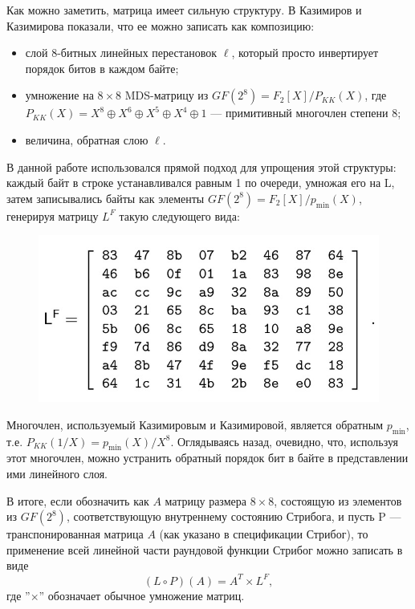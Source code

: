 Как можно заметить, матрица имеет сильную структуру. В \cite{KK13} Казимиров и Казимирова показали, что ее можно записать как композицию:
\begin{itemize}
    \item слой 8-битных линейных перестановок \(\ell\), который просто инвертирует порядок битов в каждом байте;
    \item умножение на $8 \times 8$ MDS-матрицу из $GF(2^8) = F_2[X]/P_{KK}(X)$, где \(P_{KK}(X) = X^8 \oplus X^6 \oplus X^5 \oplus X^4 \oplus 1\) — примитивный многочлен степени 8;
    \item величина, обратная слою \(\ell\).
\end{itemize}

В данной работе использовался прямой подход для упрощения этой структуры: каждый байт в строке устанавливался равным 1 по очереди, умножая его на L, затем записывались байты как элементы $GF(2^8) = F_2[X]/p_{\text{min}}(X)$, генерируя матрицу $L^F$ такую следующего вида:
\begin{figure}
  \centering
  \includegraphics[scale=0.9]{contents/pics/LF_matrix.png}
\end{figure}

Многочлен, используемый Казимировым и Казимировой, является обратным \(p_{\text{min}}\), т.е. \(P_{KK}(1/X) = p_{\text{min}}(X)/X^8\). Оглядываясь назад, очевидно, что, используя этот многочлен, можно устранить обратный порядок бит в байте в представлении ими линейного слоя.

В итоге, если обозначить как $A$ матрицу размера $8 \times 8$, состоящую из элементов из $GF(2^8)$, соответствующую внутреннему состоянию Стрибога, и пусть P — транспонированная матрица $A$ (как указано в спецификации Стрибог), то применение всей линейной части раундовой функции Стрибог можно записать в виде
\[
(L \circ P)(A) = A^T \times L^F,
\]
где ''$\times$'' обозначает обычное умножение матриц.

